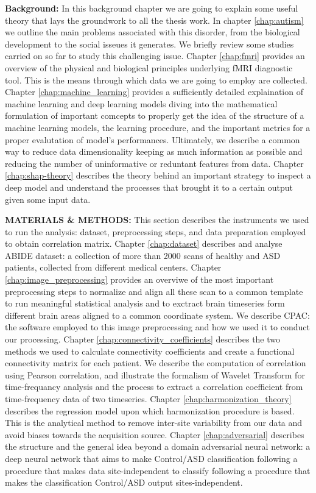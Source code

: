 \documentclass[11pt]{report}
\begin{document}
\textbf{Background:} In this background chapter we are going to explain some useful theory that lays the groundwork to all the thesis work.
In chapter \ref{chap:autism} we outline the main problems associated with this disorder, from the biological development to the social isseues it generates. We briefly review some studies carried on so far to study this challenging issue.
Chapter \ref{chap:fmri} provides an overview of the physical and biological principles underlying fMRI diagnostic tool. This is the means through which data we are going to employ are collected.
Chapter \ref{chap:machine_learning} provides a sufficiently detailed explaination of machine learning and deep learning models diving into the mathematical formulation of important comcepts to properly get the idea of the structure of a machine learning models, the learning procedure, and the important metrics for a proper evalutation of model's performances. Ultimately, we describe a common way to reduce data dimensionality keeping as much information as possible and reducing the number of uninformative or reduntant features from data.
Chapter \ref{chap:shap-theory} describes the theory behind an important strategy to inspect a deep model and understand the processes that brought it to a certain output given some input data.

\textbf{MATERIALS \& METHODS:} This section describes the instruments we used to run the analysis: dataset, preprocessing steps, and data preparation employed to obtain correlation matrix.
Chapter \ref{chap:dataset} describes and analyse ABIDE dataset: a collection of more than 2000 scans of healthy and ASD patients, collected from different medical centers.
Chapter \ref{chap:image_preprocessing} provides an overviwe of the most important preprocessing steps to normalize and align all these scan to a common template to run meaningful statistical analysis and to exctract brain timeseries form different brain areas aligned to a common coordinate system. We describe CPAC: the software employed to this image preprocessing and how we used it to conduct our processing.
Chapter \ref{chap:connectivity_coefficients} describes the two methods we used to calculate connectivity coefficients and create a functional connectivity matrix for each patient. We describe the computation of correlation using Pearson correlation, and illustrate the formalism of Wavelet Transform for time-frequancy analysis and the process to extract a correlation coefficient from time-frequency data of two timeseries.
Chapter \ref{chap:harmonization_theory} describes the regression model upon which harmonization procedure is based. This is the analytical method to remove inter-site variability from our data and avoid biases towards the acquisition source.
Chapter \ref{chap:adversarial} describes the structure and the general idea beyond a domain adversarial neural network: a deep neural network that aims
to make Control/ASD classification following a procedure that makes data site-independent to classify following a procedure that makes the classification Control/ASD output sites-independent.
\end{document}
